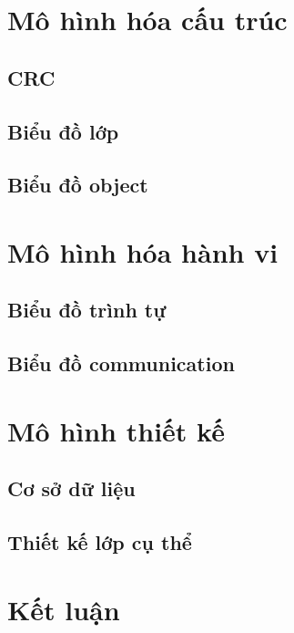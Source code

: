 \documentclass[12pt]{report}
\begin{document}
\section{Mô hình hóa cấu trúc}
\subsection{CRC}
\subsection{Biểu đồ lớp}
\subsection{Biểu đồ object}

\section{Mô hình hóa hành vi}
\subsection{Biểu đồ trình tự}
\subsection{Biểu đồ communication}

\section{Mô hình thiết kế}
\subsection{Cơ sở dữ liệu}
\subsection{Thiết kế lớp cụ thể}

\section{Kết luận}
\end{document}
